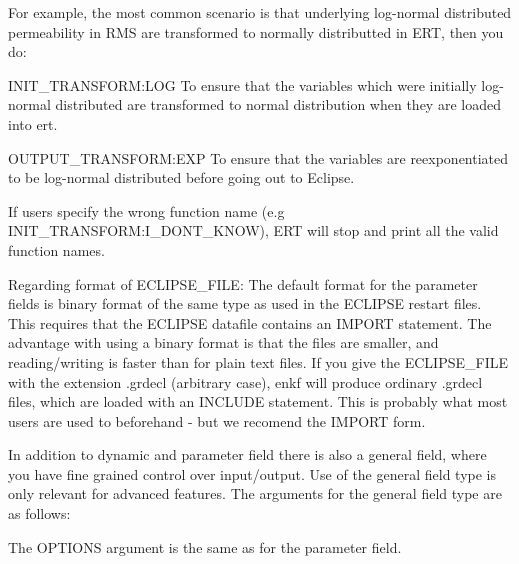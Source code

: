 \documentclass[letterpaper,10pt,english]{sphinxmanual}
\begin{document}
\begin{sphinxShadowBox}
For example, the most common scenario is that underlying log-normal
distributed permeability in RMS are transformed to normally distributted in
ERT, then you do:

INIT\_TRANSFORM:LOG To ensure that the variables which were initially
log-normal distributed are transformed to normal distribution when they are
loaded into ert.

OUTPUT\_TRANSFORM:EXP To ensure that the variables are reexponentiated to be
log-normal distributed before going out to Eclipse.

If users specify the wrong function name (e.g INIT\_TRANSFORM:I\_DONT\_KNOW), ERT
will stop and print all the valid function names.

Regarding format of ECLIPSE\_FILE: The default format for the parameter fields
is binary format of the same type as used in the ECLIPSE restart files. This
requires that the ECLIPSE datafile contains an IMPORT statement. The advantage
with using a binary format is that the files are smaller, and reading/writing
is faster than for plain text files. If you give the ECLIPSE\_FILE with the
extension .grdecl (arbitrary case), enkf will produce ordinary .grdecl files,
which are loaded with an INCLUDE statement. This is probably what most users
are used to beforehand - but we recomend the IMPORT form.


In addition to dynamic and parameter field there is also a general field,
where you have fine grained control over input/output. Use of the general
field type is only relevant for advanced features. The arguments for the
general field type are as follows:

%
\begin{sphinxVerbatim}[commandchars=\\\{\}]
               
\end{sphinxVerbatim}

The OPTIONS argument is the same as for the parameter field.
\end{sphinxShadowBox}
\label{\detokenize{keywords/index:gen-data}}
\end{document}
